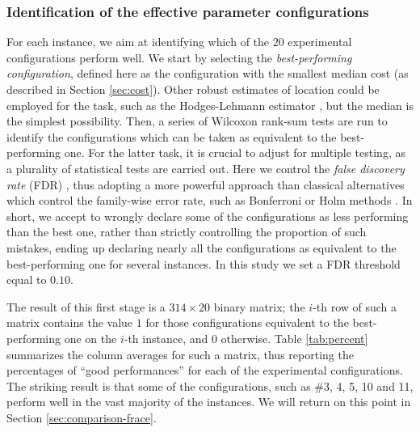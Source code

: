 \documentclass[authoryear,12pt]{article}
\begin{document}
\subsubsection{Identification of the effective parameter configurations}
\label{sec:statistical:1}

For each instance, we aim at identifying which of the $20$ experimental
configurations perform well.  We start by selecting the \emph{best-performing
configuration}, defined here as the configuration with the smallest median cost
(as described in Section \ref{sec:cost}). Other robust estimates of location
could be employed for the task, such as the Hodges-Lehmann estimator
\citep[e.g.,][\S 3.2]{HoWD2013}, but the median is the simplest possibility.
Then, a series of Wilcoxon rank-sum tests are run to identify the configurations
which can be taken as equivalent to the best-performing one. For the latter
task, it is crucial to adjust for multiple testing, as a plurality of
statistical tests are carried out. Here we control the \emph{false discovery rate}
(FDR) \citep{Benjamini95}, thus adopting a more powerful approach
than classical alternatives which control the family-wise error rate, such as
Bonferroni or Holm methods \citep[see][Chapter 18]{HaTF2009}.  In short, we
accept to wrongly declare some of the configurations as less performing than
the best one, rather than strictly controlling the proportion of such mistakes,
ending up declaring nearly all the configurations as equivalent to the
best-performing one for several instances. In this study we set a FDR threshold
equal to $0.10$.

The result of this first stage is a $314 \times 20$ binary matrix; the $i$-th
row of such a matrix contains the value $1$ for those configurations equivalent to
the best-performing one on the $i$-th instance, and $0$ otherwise.  Table
\ref{tab:percent} summarizes the column averages for such a matrix, thus
reporting the percentages of ``good performances'' for each of the experimental
configurations. The striking result is that some of the configurations, such as
\#3, 4, 5, 10 and 11, perform well in the vast majority of the instances.  We
will return on this point in Section \ref{sec:comparison-frace}.
\end{document}
